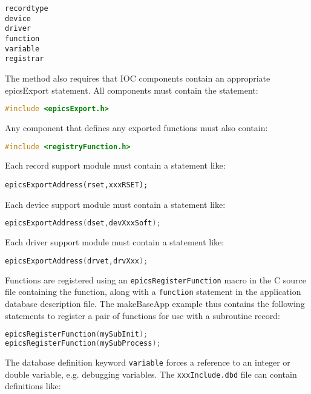 \begin{verbatim}
recordtype
device
driver
function
variable
registrar
\end{verbatim}

The method also requires that IOC components contain an appropriate epicsExport statement.
All components must contain the statement:

\begin{lstlisting}[language=C]
#include <epicsExport.h>
\end{lstlisting}

Any component that defines any exported functions must also contain:

\begin{lstlisting}[language=C]
#include <registryFunction.h>
\end{lstlisting}

Each record support module must contain a statement like:

\begin{verbatim}
epicsExportAddress(rset,xxxRSET);
\end{verbatim}

Each device support module must contain a statement like:

\begin{lstlisting}[language=C]
epicsExportAddress(dset,devXxxSoft);
\end{lstlisting}

Each driver support module must contain a statement like:

\begin{lstlisting}[language=C]
epicsExportAddress(drvet,drvXxx);
\end{lstlisting}

Functions are registered using an \verb|epicsRegisterFunction| macro in the C source file containing the function, along with a \verb|function| statement in the application database description file.
The makeBaseApp example thus contains the following statements to register a pair of functions for use with a subroutine record:

\begin{lstlisting}[language=C]
epicsRegisterFunction(mySubInit);
epicsRegisterFunction(mySubProcess);
\end{lstlisting}

The database definition keyword \verb|variable| forces a reference to an integer or double variable, e.g. debugging variables.
The \verb|xxxInclude.dbd| file can contain definitions like:

